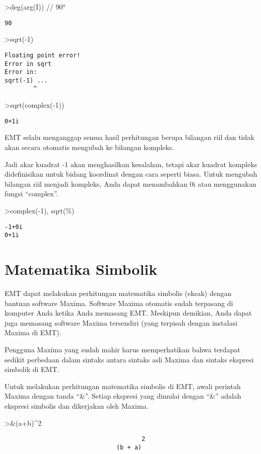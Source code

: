 \documentclass[
]{book}
\begin{document}
\textgreater deg(arg(I)) // 90°

\begin{verbatim}
90
\end{verbatim}

\textgreater sqrt(-1)

\begin{verbatim}
Floating point error!
Error in sqrt
Error in:
sqrt(-1) ...
        ^
\end{verbatim}

\textgreater sqrt(complex(-1))

\begin{verbatim}
0+1i
\end{verbatim}

EMT selalu menganggap semua hasil perhitungan berupa bilangan riil dan tidak akan secara otomatis mengubah ke bilangan kompleks.

Jadi akar kuadrat -1 akan menghasilkan kesalahan, tetapi akar kuadrat kompleks didefinisikan untuk bidang koordinat dengan cara seperti biasa. Untuk mengubah bilangan riil menjadi kompleks, Anda dapat menambahkan 0i atau menggunakan fungsi ``complex''.

\textgreater complex(-1), sqrt(\%)

\begin{verbatim}
-1+0i 
0+1i
\end{verbatim}

\chapter{Matematika Simbolik}\label{matematika-simbolik}

EMT dapat melakukan perhitungan matematika simbolis (eksak) dengan bantuan software Maxima. Software Maxima otomatis sudah terpasang di komputer Anda ketika Anda memasang EMT. Meskipun demikian, Anda dapat juga memasang software Maxima tersendiri (yang terpisah dengan instalasi Maxima di EMT).

Pengguna Maxima yang sudah mahir harus memperhatikan bahwa terdapat sedikit perbedaan dalam sintaks antara sintaks asli Maxima dan sintaks ekspresi simbolik di EMT.

Untuk melakukan perhitungan matematika simbolis di EMT, awali perintah Maxima dengan tanda ``\&''. Setiap ekspresi yang dimulai dengan ``\&'' adalah ekspresi simbolis dan dikerjakan oleh Maxima.

\textgreater\&(a+b)\^{}2

\begin{verbatim}
                                      2
                               (b + a)
\end{verbatim}
\end{document}
